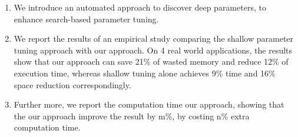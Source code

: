 \begin{enumerate}

\item We introduce an automated approach to discover deep parameters, to enhance search-based parameter tuning.

\item We report the results of an empirical study comparing the shallow parameter tuning approach with our approach. On 4 real world applications, the results show that our approach can save 21\% of wasted memory and reduce 12\% of execution time, whereas shallow tuning alone achieves 9\% time and 16\% space reduction correspondingly. 

\item Further more, we report the computation time our approach, showing that the our approach improve the result by m\%, by costing n\% extra computation time.

\end{enumerate}




